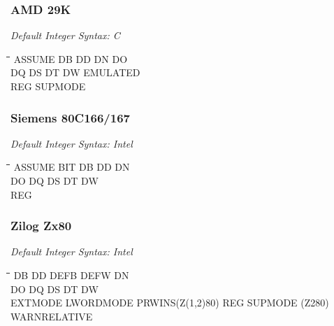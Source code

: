 \subsubsection{AMD 29K}

{\em Default Integer Syntax: C}

{\tt\begin{tabbing}
\hspace{3cm}\=\hspace{3cm}\=\hspace{3cm}\=\hspace{3cm}\=\kill
ASSUME     \> DB          \> DD          \> DN          \> DO \\
DQ         \> DS          \> DT          \> DW          \> EMULATED \\
REG        \> SUPMODE \\
\end{tabbing}}

\subsubsection{Siemens 80C166/167}

{\em Default Integer Syntax: Intel}

{\tt\begin{tabbing}
\hspace{3cm}\=\hspace{3cm}\=\hspace{3cm}\=\hspace{3cm}\=\kill
ASSUME     \> BIT         \> DB          \> DD          \> DN \\
DO         \> DQ          \> DS          \> DT          \> DW \\
REG \\
\end{tabbing}}

\subsubsection{Zilog Zx80}

{\em Default Integer Syntax: Intel}

{\tt\begin{tabbing}
\hspace{3cm}\=\hspace{3cm}\=\hspace{3cm}\=\hspace{3cm}\=\kill
DB         \> DD          \> DEFB        \> DEFW        \> DN \\
DO         \> DQ          \> DS          \> DT          \> DW \\
EXTMODE    \> LWORDMODE   \> PRWINS(Z(1,2)80)\> REG         \> SUPMODE (Z280) \\
WARNRELATIVE \\
\end{tabbing}}

